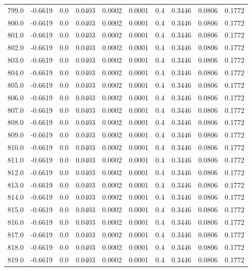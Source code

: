 \begin{longtable}{lrrrrrrrrr}
799.0 & -0.6619 & 0.0 & 0.0403 & 0.0002 & 0.0001 & 0.4 & 0.3446 & 0.0806 & 0.1772 \\
800.0 & -0.6619 & 0.0 & 0.0403 & 0.0002 & 0.0001 & 0.4 & 0.3446 & 0.0806 & 0.1772 \\
801.0 & -0.6619 & 0.0 & 0.0403 & 0.0002 & 0.0001 & 0.4 & 0.3446 & 0.0806 & 0.1772 \\
802.0 & -0.6619 & 0.0 & 0.0403 & 0.0002 & 0.0001 & 0.4 & 0.3446 & 0.0806 & 0.1772 \\
803.0 & -0.6619 & 0.0 & 0.0403 & 0.0002 & 0.0001 & 0.4 & 0.3446 & 0.0806 & 0.1772 \\
804.0 & -0.6619 & 0.0 & 0.0403 & 0.0002 & 0.0001 & 0.4 & 0.3446 & 0.0806 & 0.1772 \\
805.0 & -0.6619 & 0.0 & 0.0403 & 0.0002 & 0.0001 & 0.4 & 0.3446 & 0.0806 & 0.1772 \\
806.0 & -0.6619 & 0.0 & 0.0403 & 0.0002 & 0.0001 & 0.4 & 0.3446 & 0.0806 & 0.1772 \\
807.0 & -0.6619 & 0.0 & 0.0403 & 0.0002 & 0.0001 & 0.4 & 0.3446 & 0.0806 & 0.1772 \\
808.0 & -0.6619 & 0.0 & 0.0403 & 0.0002 & 0.0001 & 0.4 & 0.3446 & 0.0806 & 0.1772 \\
809.0 & -0.6619 & 0.0 & 0.0403 & 0.0002 & 0.0001 & 0.4 & 0.3446 & 0.0806 & 0.1772 \\
810.0 & -0.6619 & 0.0 & 0.0403 & 0.0002 & 0.0001 & 0.4 & 0.3446 & 0.0806 & 0.1772 \\
811.0 & -0.6619 & 0.0 & 0.0403 & 0.0002 & 0.0001 & 0.4 & 0.3446 & 0.0806 & 0.1772 \\
812.0 & -0.6619 & 0.0 & 0.0403 & 0.0002 & 0.0001 & 0.4 & 0.3446 & 0.0806 & 0.1772 \\
813.0 & -0.6619 & 0.0 & 0.0403 & 0.0002 & 0.0001 & 0.4 & 0.3446 & 0.0806 & 0.1772 \\
814.0 & -0.6619 & 0.0 & 0.0403 & 0.0002 & 0.0001 & 0.4 & 0.3446 & 0.0806 & 0.1772 \\
815.0 & -0.6619 & 0.0 & 0.0403 & 0.0002 & 0.0001 & 0.4 & 0.3446 & 0.0806 & 0.1772 \\
816.0 & -0.6619 & 0.0 & 0.0403 & 0.0002 & 0.0001 & 0.4 & 0.3446 & 0.0806 & 0.1772 \\
817.0 & -0.6619 & 0.0 & 0.0403 & 0.0002 & 0.0001 & 0.4 & 0.3446 & 0.0806 & 0.1772 \\
818.0 & -0.6619 & 0.0 & 0.0403 & 0.0002 & 0.0001 & 0.4 & 0.3446 & 0.0806 & 0.1772 \\
819.0 & -0.6619 & 0.0 & 0.0403 & 0.0002 & 0.0001 & 0.4 & 0.3446 & 0.0806 & 0.1772 \\

\end{longtable}
